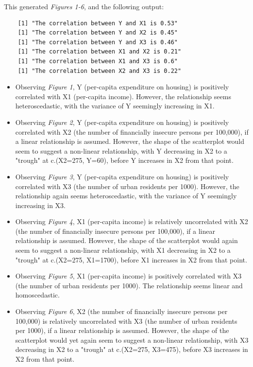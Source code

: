 \documentclass[12pt,letterpaper]{article}
\begin{document}


This generated \emph{Figures 1-6}, and the following output:

\begin{verbatim}
	[1] "The correlation between Y and X1 is 0.53"
	[1] "The correlation between Y and X2 is 0.45"
	[1] "The correlation between Y and X3 is 0.46"
	[1] "The correlation between X1 and X2 is 0.21"
	[1] "The correlation between X1 and X3 is 0.6"
	[1] "The correlation between X2 and X3 is 0.22"
\end{verbatim}

\begin{itemize}
	\item 
	Observing \emph{Figure 1}, Y (per-capita expenditure on housing) is positively correlated with X1 (per-capita income). However, the relationship seems heteroscedastic, with the variance of Y seemingly increasing in X1.
	\item 
	Observing \emph{Figure 2}, Y (per-capita expenditure on housing) is positively correlated with X2 (the number of financially insecure persons per 100,000), if a linear relationship is assumed. However, the shape of the scatterplot would seem to suggest a non-linear relationship, with Y decreasing in X2 to a "trough" at c.(X2=275, Y=60), before Y increases in X2 from that point.
	\item 
	Observing \emph{Figure 3}, Y (per-capita expenditure on housing) is positively correlated with X3 (the number of urban residents per 1000). However, the relationship again seems heteroscedastic, with the variance of Y seemingly increasing in X3.
	\item 
	Observing \emph{Figure 4}, X1 (per-capita income) is relatively uncorrelated with X2 (the number of financially insecure persons per 100,000), if a linear relationship is assumed. However, the shape of the scatterplot would again seem to suggest a non-linear relationship, with X1 decreasing in X2 to a "trough" at c.(X2=275, X1=1700), before X1 increases in X2 from that point.
	\item 
	Observing \emph{Figure 5}, X1 (per-capita income) is positively correlated with X3 (the number of urban residents per 1000). The relationship seems linear and homoscedastic.
	\item 
	Observing \emph{Figure 6}, X2 (the number of financially insecure persons per 100,000) is relatively uncorrelated with X3 (the number of urban residents per 1000), if a linear relationship is assumed. However, the shape of the scatterplot would yet again seem to suggest a non-linear relationship, with X3 decreasing in X2 to a "trough" at c.(X2=275, X3=475), before X3 increases in X2 from that point.
\end{itemize}
\end{document}
